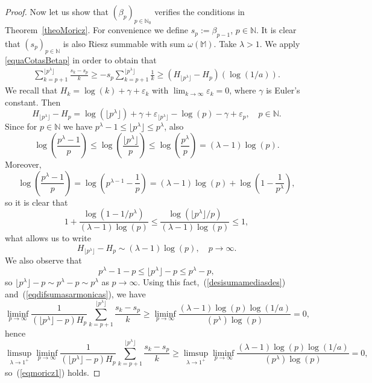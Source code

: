 \documentclass[11pt,a4paper]{article}
\theoremstyle{definition}
\def\oo{\infty}
\def\ri{\rightarrow}
\def\b{\beta}
\def\ep{\varepsilon}
\def\o{\omega}
\def\ga{\gamma}
\def\N{\mathbb{N}}
\def\M{\mathbb{M}}
\begin{document}
\begin{proof}
Now let us show that $(\b_p)_{p\in\N_0}$ verifies the conditions in
  Theorem~\ref{theoMoricz}. For convenience we define $s_p:=\b_{p-1}$, $p\in\N$.
  It is clear that $(s_p)_{p\in\N}$ is also Riesz summable with sum $\o(\M)$.
Take $\lambda>1$. We apply \eqref{equaCotasBetap} in order to obtain that
  \begin{align}\label{desisumamediasdes}
   \sum_{k=p+1}^{\lfloor p^\lambda\rfloor}\frac{s_k-s_p}{k} \geq -s_p \sum_{k=p+1}^{\lfloor p^\lambda\rfloor}\frac{1}{k} \geq (H_{\lfloor p^\lambda\rfloor}-H_{p})(\log(1/a)).
  \end{align}
We recall that $H_k=\log(k)+\gamma+\ep_k$ with $\lim_{k\ri\oo} \ep_k=0$, where $\ga$ is Euler's constant. Then
\begin{equation*}%
 H_{ \lfloor p^\lambda \rfloor}-H_{p}=\log( \lfloor p^\lambda \rfloor)+\gamma+\ep_{ \lfloor p^\lambda \rfloor }-\log(p)-\gamma+\ep_{p},\quad p\in\N.%
\end{equation*}
Since for $p\in\N$ we have $p^\lambda-1 \leq \lfloor p^\lambda \rfloor \leq p^\lambda$, also
  $$\log\left(\frac{p^\lambda-1}{p}\right)\leq \log\left(\frac{ \lfloor p^\lambda \rfloor}{p}\right)\leq \log\left(\frac{p^\lambda}{p}\right)= (\lambda-1 )\log(p).$$
Moreover,
  $$\log\left(\frac{p^\lambda-1}{p}\right)=\log \left(p^{\lambda-1}-\frac{1}{p}\right)= (\lambda-1)\log(p)+\log\left(1-\frac{1}{p^\lambda}\right),   $$
  so it is clear that
  $$1+ \frac{\log (1-1/p^\lambda)}{(\lambda-1)\log(p)}\leq \frac{\log\left( \lfloor p^\lambda \rfloor/ p \right)}{(\lambda-1)\log(p)}\leq 1,$$
what allows us to write
\begin{equation}\label{eqdifsumasarmonicas}
 H_{ \lfloor p^\lambda \rfloor}-H_{p}\sim (\lambda-1)\log(p),\quad p\to\infty.
\end{equation}
We also observe that
 $$p^\lambda-1-p\leq \lfloor p^\lambda \rfloor-p\leq p^\lambda-p,$$
 so $ \lfloor p^\lambda \rfloor-p\sim p^\lambda-p \sim p^\lambda$ as $p\ri\oo$. Using this fact,~(\ref{desisumamediasdes}) and~(\ref{eqdifsumasarmonicas}),
 we have
 $$\liminf_{p\ri\oo} \frac{1}{(\lfloor p^\lambda \rfloor-p)H_p}\sum_{k=p+1}^{\lfloor p^\lambda \rfloor}\frac{s_k-s_p}{k}
 \geq\liminf_{p\ri\oo} \frac{(\lambda-1)\log(p)\log(1/a)}{(p^\lambda)\log(p)}=0, $$
 hence
  $$\limsup_{\lambda\ri1^+}\liminf_{p\ri\oo} \frac{1}{(\lfloor p^\lambda \rfloor-p)H_p}\sum_{k=p+1}^{\lfloor p^\lambda \rfloor}\frac{s_k-s_p}{k}
  \geq \limsup_{\lambda\ri1^+} \liminf_{p\ri\oo} \frac{(\lambda-1)\log(p)\log(1/a)}{(p^\lambda)\log(p)} =0,$$
  so~(\ref{eqmoricz1}) holds.


\end{proof}
\end{document}
